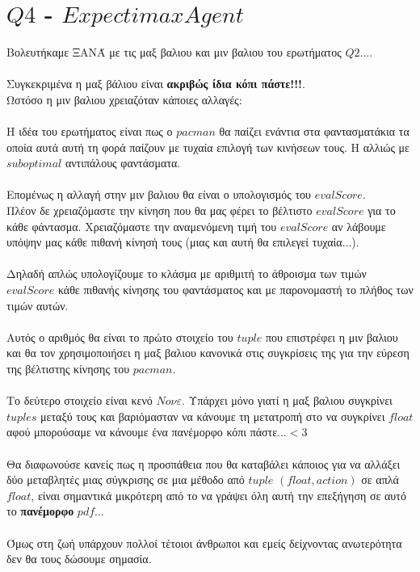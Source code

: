 \documentclass[12pt]{article}
\begin{document}
\section*{$Q4$ - $ExpectimaxAgent$ }
Βολευτήκαμε ΞΑΝΆ με τις μαξ βαλιου και μιν βαλιου του ερωτήματος $Q2$....\\\\
Συγκεκριμένα η μαξ βάλιου είναι \textbf{ακριβώς ίδια κόπι πάστε!!!}.\\
Ωστόσο η μιν βαλιου χρειαζόταν κάποιες αλλαγές:\\\\
Η ιδέα του ερωτήματος είναι πως ο $pacman$ θα παίζει ενάντια στα φαντασματάκια τα οποία αυτά αυτή τη φορά παίζουν με τυχαία επιλογή των κινήσεων τους. Η αλλιώς με $suboptimal$ αντιπάλους φαντάσματα. \\\\
Επομένως η αλλαγή στην μιν βαλιου θα είναι ο υπολογισμός του $evalScore$.\\
Πλέον δε χρειαζόμαστε την κίνηση που θα μας φέρει το βέλτιστο $evalScore$ για το κάθε φάντασμα. Χρειαζόμαστε την αναμενόμενη τιμή του $evalScore$ αν λάβουμε υπόψην μας κάθε πιθανή κίνησή τους (μιας και αυτή θα επιλεγεί τυχαία...).\\\\
Δηλαδή απλώς υπολογίζουμε το κλάσμα με αριθμιτή το άθροισμα των τιμών $evalScore$ κάθε πιθανής κίνησης του φαντάσματος και με παρονομαστή το πλήθος των τιμών αυτών. \\\\
Αυτός ο αριθμός θα είναι το πρώτο στοιχείο του $tuple$ που επιστρέφει η μιν βαλιου και θα τον χρησιμοποιήσει η μαξ βαλιου κανονικά στις συγκρίσεις της για την εύρεση της βέλτιστης κίνησης του $pacman$. \\\\
Το δεύτερο στοιχείο είναι κενό $Νονε$. Υπάρχει μόνο γιατί η μαξ βαλιου συγκρίνει $tuples$ μεταξύ τους και βαριόμασταν να κάνουμε τη μετατροπή στο να συγκρίνει $float$ αφού μπορούσαμε να κάνουμε ένα πανέμορφο κόπι πάστε...$<$3\\\\
Θα διαφωνούσε κανείς πως η προσπάθεια που θα καταβάλει κάποιος για να αλλάξει δύο μεταβλητές μιας σύγκρισης σε μια μέθοδο από $tuple$ $(float , action )$ σε απλά $float$, είναι σημαντικά μικρότερη από το να γράψει όλη αυτή την επεξήγηση σε αυτό το \textbf{πανέμορφο} $pdf$...\\\\
Όμως στη ζωή υπάρχουν πολλοί τέτοιοι άνθρωποι και εμείς δείχνοντας ανωτερότητα δεν θα τους δώσουμε σημασία.\\\\
\end{document}
